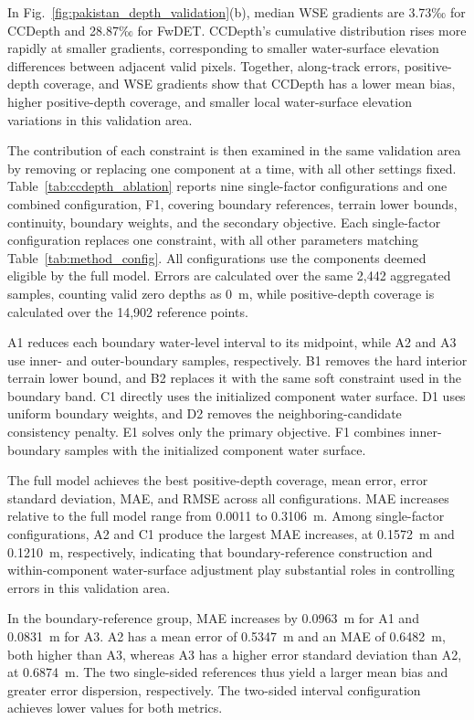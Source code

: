 \documentclass[authoryear,preprint,12pt]{elsarticle}
\newcommand{\floatingtableinput}[1]{%
  \begingroup
  \let\originaltable\table
  \renewcommand{\table}[1][]{\originaltable[!htb]}%
  \endgroup
}
\begin{document}
In Fig.~\ref{fig:pakistan_depth_validation}(b), median WSE gradients are 3.73‰ for CCDepth and 28.87‰ for FwDET. CCDepth's cumulative distribution rises more rapidly at smaller gradients, corresponding to smaller water-surface elevation differences between adjacent valid pixels. Together, along-track errors, positive-depth coverage, and WSE gradients show that CCDepth has a lower mean bias, higher positive-depth coverage, and smaller local water-surface elevation variations in this validation area.

The contribution of each constraint is then examined in the same validation area by removing or replacing one component at a time, with all other settings fixed. Table~\ref{tab:ccdepth_ablation} reports nine single-factor configurations and one combined configuration, F1, covering boundary references, terrain lower bounds, continuity, boundary weights, and the secondary objective. Each single-factor configuration replaces one constraint, with all other parameters matching Table~\ref{tab:method_config}. All configurations use the components deemed eligible by the full model. Errors are calculated over the same 2,442 aggregated samples, counting valid zero depths as 0~m, while positive-depth coverage is calculated over the 14,902 reference points.

A1 reduces each boundary water-level interval to its midpoint, while A2 and A3 use inner- and outer-boundary samples, respectively. B1 removes the hard interior terrain lower bound, and B2 replaces it with the same soft constraint used in the boundary band. C1 directly uses the initialized component water surface. D1 uses uniform boundary weights, and D2 removes the neighboring-candidate consistency penalty. E1 solves only the primary objective. F1 combines inner-boundary samples with the initialized component water surface.

\floatingtableinput{tables/table8_ccdepth_constraint_ablation.tex}

The full model achieves the best positive-depth coverage, mean error, error standard deviation, MAE, and RMSE across all configurations. MAE increases relative to the full model range from 0.0011 to 0.3106~m. Among single-factor configurations, A2 and C1 produce the largest MAE increases, at 0.1572~m and 0.1210~m, respectively, indicating that boundary-reference construction and within-component water-surface adjustment play substantial roles in controlling errors in this validation area.

In the boundary-reference group, MAE increases by 0.0963~m for A1 and 0.0831~m for A3. A2 has a mean error of 0.5347~m and an MAE of 0.6482~m, both higher than A3, whereas A3 has a higher error standard deviation than A2, at 0.6874~m. The two single-sided references thus yield a larger mean bias and greater error dispersion, respectively. The two-sided interval configuration achieves lower values for both metrics.
\end{document}

